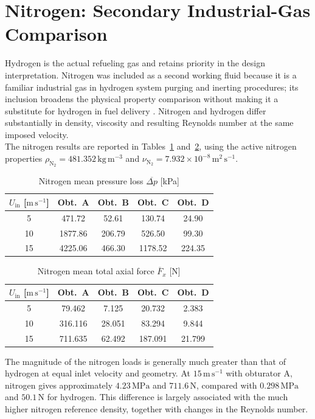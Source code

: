 \clearpage


\section{Nitrogen: Secondary Industrial-Gas Comparison}
\label{sec:nitrogen_comparison}

Hydrogen is the actual refueling gas and retains priority in the design interpretation. 
Nitrogen was included as a second working fluid because it is a familiar industrial gas in hydrogen system purging and inerting procedures; its inclusion broadens the physical property comparison without making it a substitute for hydrogen in fuel delivery \cite{h2tools_purging,doe_hydrogen_practices}. Nitrogen and hydrogen differ substantially in density, viscosity and resulting Reynolds number at the same imposed velocity.\\

The nitrogen results are reported in Tables~\ref{tab:nitrogen_pressure} and~\ref{tab:nitrogen_force}, using the active nitrogen properties $\rho_{\mathrm{N}_2}=481.352\,\mathrm{kg\,m^{-3}}$ and $\nu_{\mathrm{N}_2}=7.932\times10^{-8}\,\mathrm{m^2\,s^{-1}}$.
\vspace{1cm}
\begin{table}[htbp]
\centering
\begin{tabular}{@{}ccccc@{}}
\toprule
$U_{\mathrm{in}}$ [$\mathrm{m\,s^{-1}}$] & \textbf{Obt.\ A} & \textbf{Obt.\ B} & \textbf{Obt.\ C} & \textbf{Obt.\ D}\\
\midrule
5 & 471.72 & 52.61 & 130.74 & 24.90\\
10 & 1877.86 & 206.79 & 526.50 & 99.30\\
15 & 4225.06 & 466.30 & 1178.52 & 224.35\\
\bottomrule
\end{tabular}
\caption{Nitrogen mean pressure loss $\overline{\Delta p}$ [kPa]}
\label{tab:nitrogen_pressure}
\end{table}

\begin{table}[htbp]
\centering
\begin{tabular}{@{}ccccc@{}}
\toprule
$U_{\mathrm{in}}$ [$\mathrm{m\,s^{-1}}$] & \textbf{Obt.\ A} & \textbf{Obt.\ B} & \textbf{Obt.\ C} & \textbf{Obt.\ D}\\
\midrule
5 & 79.462 & 7.125 & 20.732 & 2.383\\
10 & 316.116 & 28.051 & 83.294 & 9.844\\
15 & 711.635 & 62.492 & 187.091 & 21.799\\
\bottomrule
\end{tabular}
\caption{Nitrogen mean total axial force $\overline{F}_x$ [N]}
\label{tab:nitrogen_force}
\end{table}
\vspace{1cm}
The magnitude of the nitrogen loads is generally much greater than that of hydrogen at equal inlet velocity and geometry. At $15\,\mathrm{m\,s^{-1}}$ with obturator A, nitrogen gives approximately $4.23\,\mathrm{MPa}$ and $711.6\,\mathrm{N}$, compared with $0.298\,\mathrm{MPa}$ and $50.1\,\mathrm{N}$ for hydrogen. This difference is largely associated with the much higher nitrogen reference density, together with changes in the Reynolds number.


